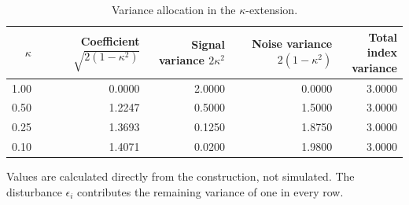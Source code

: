 \begin{table}[!htbp]
\caption{Variance allocation in the $\kappa$-extension.}
\label{tab:kappa-illustration}
\centering
\begin{tabular}{rrrrr}
\toprule
$\kappa$ & \shortstack{Coefficient\\$\sqrt{2(1-\kappa^2)}$} & \shortstack{Signal variance\\$2\kappa^2$} & \shortstack{Noise variance\\$2(1-\kappa^2)$} & \shortstack{Total index\\variance} \\
\midrule
1.00 & 0.0000 & 2.0000 & 0.0000 & 3.0000 \\
0.50 & 1.2247 & 0.5000 & 1.5000 & 3.0000 \\
0.25 & 1.3693 & 0.1250 & 1.8750 & 3.0000 \\
0.10 & 1.4071 & 0.0200 & 1.9800 & 3.0000 \\
\bottomrule
\end{tabular}
\begin{tablenotes}
Values are calculated directly from the construction, not simulated. The disturbance $\epsilon_i$ contributes the remaining variance of one in every row.
\end{tablenotes}
\end{table}
